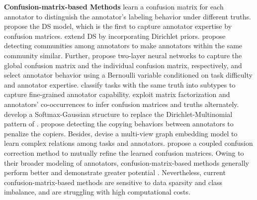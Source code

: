 \documentclass[letterpaper]{article} %
\begin{document}
\textbf{Confusion-matrix-based Methods} learn a confusion matrix for each annotator to distinguish the annotator's labeling behavior under different truths. \citet{DawidSkene1979} propose the DS model, which is the first to capture annotator expertise by confusion matrices. \citet{KimGhahramani2012} extend DS \cite{DawidSkene1979} by incorporating Dirichlet priors. \citet{Venanzietal2014} propose detecting communities among annotators to make annotators within the same community similar. Further, \citet{Chu21b} propose two-layer neural networks to capture the global confusion matrix and the individual confusion matrix, respectively, and select annotator behavior using a Bernoulli variable conditioned on task difficulty and annotator expertise. \citet{Lietal2019a} classify tasks with the same truth into subtypes to capture fine-grained annotator capability. \citet{Ibrahimetal19,Ibrahim21} exploit matrix factorization and annotators' co-occurrences to infer confusion matrices and truths alternately. \citet{Chenetal25} develop a Softmax-Gaussian structure to replace the Dirichlet-Multinomial pattern of \cite{KimGhahramani2012}. \citet{Songetal2021} propose detecting the copying behaviors between annotators to penalize the copiers. Besides, \citet{Wuetal2023} devise a multi-view graph embedding model to learn complex relations among tasks and annotators. \citet{Zhangetal24} propose a coupled confusion correction method to mutually refine the learned confusion matrices. Owing to their broader modeling of annotators, confusion-matrix-based methods generally perform better and demonstrate greater potential \cite{Zhangetal24}. Nevertheless, current confusion-matrix-based methods are sensitive to data sparsity and class imbalance, and are struggling with high computational costs.
\end{document}
